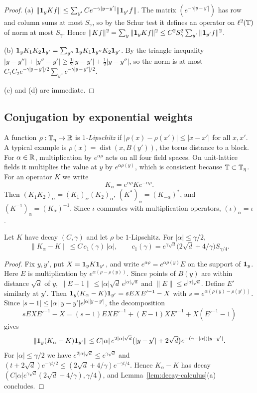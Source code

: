 \begin{proof}
(a) $\|\mathbf 1_yKf\|\le\sum_{y'}Ce^{-\gamma|y-y'|}\|\mathbf 1_{y'}f\|$. The matrix $(e^{-\gamma|y-y'|})$ has row and column sums at most $S_\gamma$, so by the Schur test it defines an operator on $\ell^2(\mathbb T)$ of norm at most $S_\gamma$. Hence $\|Kf\|^2=\sum_y\|\mathbf 1_yKf\|^2\le C^2S_\gamma^2\sum_{y'}\|\mathbf 1_{y'}f\|^2$.

(b) $\mathbf 1_yK_1K_2\mathbf 1_{y'}=\sum_{y''}\mathbf 1_yK_1\mathbf 1_{y''}K_2\mathbf 1_{y'}$. By the triangle inequality $|y-y''|+|y''-y'|\ge\frac12|y-y'|+\frac12|y-y''|$, so the norm is at most $C_1C_2e^{-\gamma|y-y'|/2}\sum_{y''}e^{-\gamma|y-y''|/2}$.

(c) and (d) are immediate.
\end{proof}

\subsection{Conjugation by exponential weights}\label{ss:5.2}

A function $\rho:\mathbb T_\eta\to\mathbb R$ is \emph{$1$-Lipschitz} if $|\rho(x)-\rho(x')|\le|x-x'|$ for all $x,x'$. A typical example is $\rho(x)=\operatorname{dist}(x,B(y'))$, the torus distance to a block. For $\alpha\in\mathbb R$, multiplication by $e^{\alpha\rho}$ acts on all four field spaces. On unit-lattice fields it multiplies the value at $y$ by $e^{\alpha\rho(y)}$, which is consistent because $\mathbb T\subset\mathbb T_\eta$. For an operator $K$ we write
\[
K_\alpha=e^{\alpha\rho}Ke^{-\alpha\rho}.
\]
Then $(K_1K_2)_\alpha=(K_1)_\alpha(K_2)_\alpha$, $(K^*)_\alpha=(K_{-\alpha})^*$, and $(K^{-1})_\alpha=(K_\alpha)^{-1}$. Since $\iota$ commutes with multiplication operators, $(\iota)_\alpha=\iota$.

\begin{lemma}\label{lem:conjugation}
Let $K$ have decay $(C,\gamma)$ and let $\rho$ be $1$-Lipschitz. For $|\alpha|\le\gamma/2$,
\[
\|K_\alpha-K\|\le C\,c_1(\gamma)\,|\alpha|,\qquad c_1(\gamma)=e^{\gamma\sqrt d}\big(2\sqrt d+4/\gamma\big)S_{\gamma/4}.
\]
\end{lemma}

\begin{proof}
Fix $y,y'$, put $X=\mathbf 1_yK\mathbf 1_{y'}$, and write $e^{\alpha\rho}=e^{\alpha\rho(y)}E$ on the support of $\mathbf 1_y$. Here $E$ is multiplication by $e^{\alpha(\rho-\rho(y))}$. Since points of $B(y)$ are within distance $\sqrt d$ of $y$, $\|E-1\|\le|\alpha|\sqrt d\,e^{|\alpha|\sqrt d}$ and $\|E\|\le e^{|\alpha|\sqrt d}$. Define $E'$ similarly at $y'$. Then $\mathbf 1_y(K_\alpha-K)\mathbf 1_{y'}=sEXE'^{-1}-X$ with $s=e^{\alpha(\rho(y)-\rho(y'))}$. Since $|s-1|\le|\alpha||y-y'|e^{|\alpha||y-y'|}$, the decomposition
\[
sEXE'^{-1}-X=(s-1)EXE'^{-1}+(E-1)XE'^{-1}+X(E'^{-1}-1)
\]
gives
\[
\|\mathbf 1_y(K_\alpha-K)\mathbf 1_{y'}\|\le C|\alpha|\,e^{2|\alpha|\sqrt d}\big(|y-y'|+2\sqrt d\big)e^{-(\gamma-|\alpha|)|y-y'|}.
\]
For $|\alpha|\le\gamma/2$ we have $e^{2|\alpha|\sqrt d}\le e^{\gamma\sqrt d}$ and $(t+2\sqrt d)e^{-\gamma t/2}\le(2\sqrt d+4/\gamma)e^{-\gamma t/4}$. Hence $K_\alpha-K$ has decay $(C|\alpha|e^{\gamma\sqrt d}(2\sqrt d+4/\gamma),\gamma/4)$, and Lemma~\ref{lem:decay-calculus}(a) concludes.
\end{proof}

